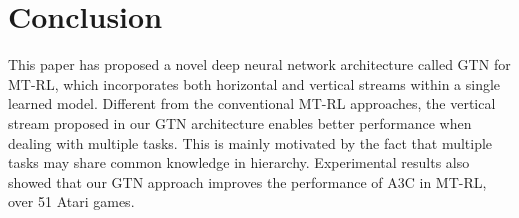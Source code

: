 \documentclass[letterpaper]{article} %
\begin{document}
\section{Conclusion}

This paper has proposed a novel deep neural network architecture called GTN for MT-RL, which incorporates both horizontal and vertical streams within a single learned model.
Different from the conventional MT-RL approaches, the vertical stream proposed in our GTN architecture enables better performance when dealing with multiple tasks.
This is mainly motivated by the fact that multiple tasks may share common knowledge in hierarchy.
Experimental results also showed that our GTN approach improves the performance of A3C in MT-RL, over 51 Atari games.


\clearpage


\end{document}

